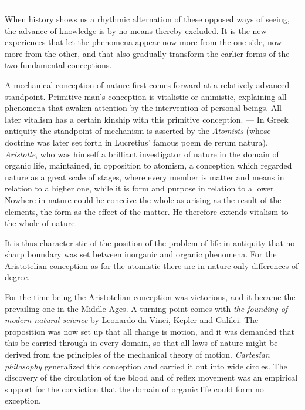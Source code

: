 \documentclass[12pt,a4paper,openany]{book}
\newcommand{\opage}[1]{\marginnote{\footnotesize\textit{[#1]}}}
\newcommand{\streg}{\begin{center}\rule{3em}{0.4pt}\end{center}}
\begin{document}
\streg{}

When history shows us a rhythmic alternation of these opposed ways of seeing,
the advance of knowledge is by no means thereby excluded. It is the new
experiences that let the phenomena appear now more from the one side, now more
from the other, and that also gradually transform the earlier forms of the two
fundamental conceptions.

A mechanical conception of nature first comes forward at a relatively advanced
standpoint. Primitive man's conception is vitalistic or animistic, explaining
all phenomena that awaken attention by the intervention of personal beings. All
later vitalism has a certain kinship with this primitive conception. --- In
Greek antiquity
\opage{42}the standpoint of mechanism is asserted by the \emph{Atomists}
(whose doctrine was later set forth in Lucretius' famous poem de rerum
natura).
\emph{Aristotle}, who was himself a brilliant investigator of nature in the
domain of organic life, maintained, in opposition to atomism, a conception which
regarded nature as a great scale of stages, where every member is matter and
means in relation to a higher one, while it is form and purpose in relation to a
lower. Nowhere in nature could he conceive the whole as arising as the result of
the elements, the form as the effect of the matter. He therefore extends
vitalism to the whole of nature.

It is thus characteristic of the position of the problem of life in antiquity
that no sharp boundary was set between
inorganic and organic phenomena. For the Aristotelian conception as for the
atomistic there are in nature only differences of degree.

For the time being the Aristotelian conception was victorious, and it became the
prevailing one in the Middle Ages. A turning point comes with \emph{the founding
of modern natural science} by Leonardo da Vinci, Kepler and Galilei. The
proposition was now set up that all change is motion, and it was demanded that
this be carried through in every domain, so that all laws of nature might be
derived from the principles of the mechanical theory of motion. \emph{Cartesian
philosophy} generalized this conception and carried it out into wide circles. The discovery
of the circulation of the blood and of reflex movement was an empirical support
for the conviction that the domain of organic life could form no exception.
\end{document}
